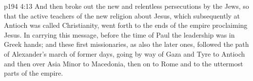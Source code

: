 \vs p194 4:13 And then broke out the new and relentless persecutions by the Jews, so that the active teachers of the new religion about Jesus, which subsequently at Antioch was called Christianity, went forth to the ends of the empire proclaiming Jesus. In carrying this message, before the time of Paul the leadership was in Greek hands; and these first missionaries, as also the later ones, followed the path of Alexander’s march of former days, going by way of Gaza and Tyre to Antioch and then over Asia Minor to Macedonia, then on to Rome and to the uttermost parts of the empire.
\quizlink
